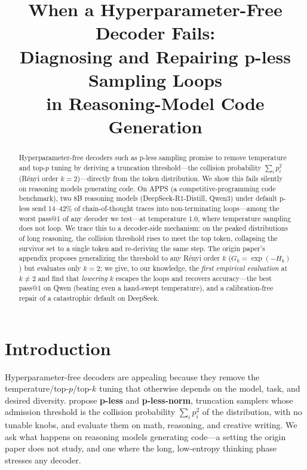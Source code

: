 \documentclass[11pt]{article}                       %
\title{When a Hyperparameter-Free Decoder Fails:\\
Diagnosing and Repairing p-less Sampling Loops\\ in Reasoning-Model Code Generation}
\author{}
\date{}
\newcommand{\tsum}{\ensuremath{\textstyle\sum}}
\begin{document}
\maketitle

\begin{abstract}
Hyperparameter-free decoders such as p-less sampling promise to remove temperature and top-$p$ tuning
by deriving a truncation threshold---the collision probability $\tsum_i p_i^2$ (R\'enyi order
$k{=}2$)---directly from the token distribution. We show this fails silently on reasoning models
generating code. On APPS (a competitive-programming code benchmark), two 8B reasoning models
(DeepSeek-R1-Distill, Qwen3) under default p-less send 14--42\% of chain-of-thought traces into
non-terminating loops---among the worst pass@1 of any decoder we test---at temperature $1.0$, where
temperature sampling does not loop. We trace this to a decoder-side mechanism: on the peaked
distributions of long reasoning, the collision threshold rises to meet the top token, collapsing the
survivor set to a single token and re-deriving the same step. The origin paper's appendix proposes generalizing the
threshold to any R\'enyi order $k$ ($G_k{=}\exp(-H_k)$) but evaluates only $k{=}2$; we give, to our
knowledge, the \emph{first empirical evaluation} at $k\neq2$ and find that \emph{lowering} $k$ escapes
the loops and recovers
accuracy---the best pass@1 on Qwen (beating even a hand-swept temperature), and a
calibration-free repair of a catastrophic default on DeepSeek.
\end{abstract}

\section{Introduction}\label{sec:intro}
Hyperparameter-free decoders are appealing because they remove the temperature/top-$p$/top-$k$ tuning
that otherwise depends on the model, task, and desired diversity. \citet{tan2025pless} propose
\textbf{p-less} and \textbf{p-less-norm}, truncation samplers whose admission threshold is the
collision probability $\tsum_i p_i^2$ of the distribution, with no tunable knobs, and evaluate them on
math, reasoning, and creative writing. We ask what happens on reasoning models generating
code---a setting the origin paper does not study, and one where the long, low-entropy thinking phase
stresses any decoder.
\end{document}
